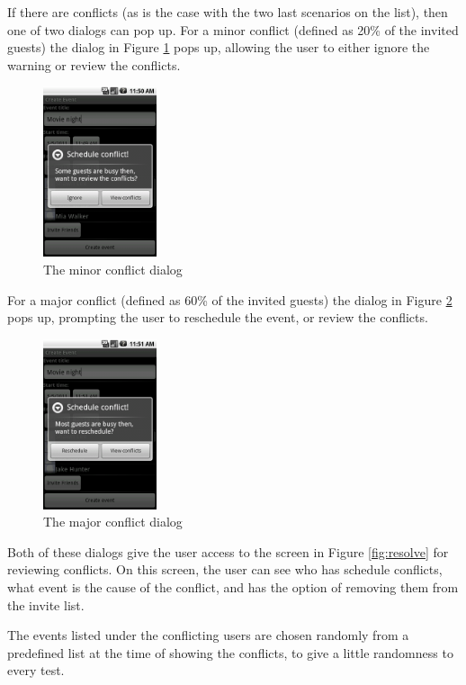 \documentclass[a4paper,11pt]{report}
\begin{document}
If there are conflicts (as is the case with the two last scenarios on the list),
then one of two dialogs can pop up. For a minor conflict (defined as 20\% of the
invited guests) the dialog in Figure \ref{fig:minor} pops up, allowing the user
to either ignore the warning or review the conflicts.

\begin{figure}[htb]
  \centering
  \includegraphics[height=50mm]{minor}
  \caption{The minor conflict dialog}
  \label{fig:minor}
\end{figure}

For a major conflict (defined as 60\% of the invited guests) the dialog in
Figure \ref{fig:major} pops up, prompting the user to reschedule the event, or
review the conflicts.

\begin{figure}[htb]
  \centering
  \includegraphics[height=50mm]{major}
  \caption{The major conflict dialog}
  \label{fig:major}
\end{figure}

Both of these dialogs give the user access to the screen in Figure
\ref{fig:resolve} for reviewing conflicts. On this screen, the user can see who
has schedule conflicts, what event is the cause of the conflict, and has the
option of removing them from the invite list.

The events listed under the conflicting users are chosen randomly from a
predefined list at the time of showing the conflicts, to give a little
randomness to every test.
\end{document}
